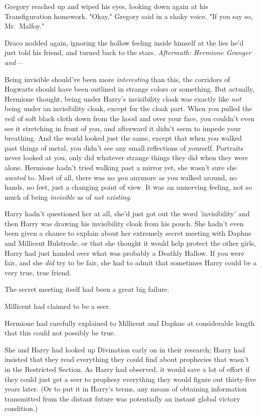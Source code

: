 Gregory reached up and wiped his eyes, looking down again at his 
Transfiguration homework. "Okay," Gregory said in a shaky voice. "If you say 
so, Mr.~Malfoy."

Draco nodded again, ignoring the hollow feeling inside himself at the lies he'd 
just told his friend, and turned back to the stars.
\sbreak
\emph{Aftermath: Hermione Granger and---}

Being invisible should've been more \emph{interesting} than this, the corridors 
of Hogwarts should have been outlined in strange colors or something. But 
actually, Hermione thought, being under Harry's invisibility cloak was exactly 
like \emph{not} being under an invisibility cloak, except for the cloak part. 
When you pulled the veil of soft black cloth down from the hood and over your 
face, you couldn't even see it stretching in front of you, and afterward it 
didn't seem to impede your breathing. And the world looked just the same, 
except that when you walked past things of metal, you didn't see any small 
reflections of yourself. Portraits never looked at you, only did whatever 
strange things they did when they were alone. Hermione hadn't tried walking 
past a mirror yet, she wasn't sure she \emph{wanted} to. Most of all, there was 
no \emph{you} anymore as you walked around, no hands, no feet, just a changing 
point of view. It was an unnerving feeling, not so much of being 
\emph{invisible} as of \emph{not existing.}

Harry hadn't questioned her at all, she'd just got out the word 'invisibility' 
and then Harry was drawing his invisibility cloak from his pouch. She hadn't 
even been given a chance to explain about her extremely secret meeting with 
Daphne and Millicent Bulstrode, or that she thought it would help protect the 
other girls, Harry had just handed over what was probably a Deathly Hallow. If 
you were fair, and she \emph{did} try to be fair, she had to admit that 
sometimes Harry could be a very true, true friend.

The secret meeting itself had been a great big failure.

Millicent had claimed to be a seer.

Hermione had carefully explained to Millicent and Daphne at considerable length 
that this could not possibly be true.

She and Harry had looked up Divination early on in their research; Harry had 
insisted that they read everything they could find about prophecies that wasn't 
in the Restricted Section. As Harry had observed, it would save a lot of effort 
if they could just get a seer to prophesy everything they would figure out 
thirty-five years later. (Or to put it in Harry's terms, any means of obtaining 
information transmitted from the distant future was potentially an instant 
global victory condition.)

